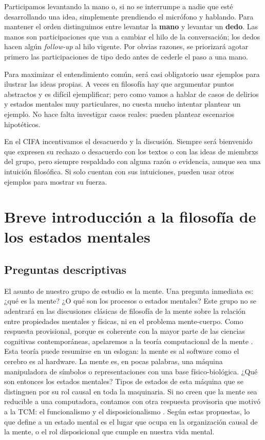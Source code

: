 \documentclass[a4paper,nofonts,justified]{tufte-handout}
\begin{document}
\begin{rules}
  \item[Distinción mano/dedo] Participamos levantando la mano o, si no se interrumpe a nadie que esté desarrollando una idea, simplemente prendiendo el micrófono y hablando. Para mantener el orden distinguimos entre levantar la \textbf{mano} y levantar un \textbf{dedo}. Las manos son participaciones que van a cambiar el hilo de la conversación; los dedos hacen algún \emph{follow-up} al hilo vigente. Por obvias razones, se priorizará agotar primero las participaciones de tipo dedo antes de cederle el paso a una mano.
  \item[Ejemplificación] Para maximizar el entendimiento común, será casi obligatorio usar ejemplos para ilustrar las ideas propias. A veces en filosofía hay que argumentar puntos abstractos y es difícil ejemplificar; pero como vamos a hablar de casos de delirios y estados mentales muy particulares, no cuesta mucho intentar plantear un ejemplo. No hace falta investigar casos reales: pueden plantear escenarios hipotéticos.
  \item[Respaldo] En el CIFA incentivamos el desacuerdo y la discusión. Siempre será bienvenido que expresen su rechazo o desacuerdo con los textos o con las ideas de miembrxs del grupo, pero siempre respaldado con alguna razón o evidencia, aunque sea una intuición filosófica. Si solo cuentan con sus intuiciones, pueden usar otros ejemplos para mostrar su fuerza.
\end{rules}

\section{Breve introducción a la filosofía de los estados mentales}

\subsection{Preguntas descriptivas}
El asunto de nuestro grupo de estudio es la mente. Una pregunta inmediata es: ¿qué es la mente? ¿O qué son los procesos o estados mentales? Este grupo no se adentrará en las discusiones clásicas de filosofía de la mente sobre la relación entre propiedades mentales y físicas, ni en el problema mente-cuerpo. Como respuesta provisional, porque es coherente con la mayor parte de las ciencias cognitivas contemporáneas, apelaremos a la teoría computacional de la mente \citep[TCM;][]{block1995}. Esta teoría puede resumirse en un eslogan: la mente es al software como el cerebro es al hardware. La mente es, en pocas palabras, una máquina manipuladora de símbolos o representaciones con una base físico-biológica. ¿Qué son entonces los estados mentales? Tipos de estados de esta máquina que se distinguen por su rol causal en toda la maquinaria. Si no creen que la mente sea reducible a una computadora, contamos con otra respuesta provisoria que motivó a la TCM: el funcionalismo y el disposicionalismo \citep{lewis1978,stalnaker1984}. Según estas propuestas, lo que define a un estado mental es el lugar que ocupa en la organización causal de la mente, o el rol disposicional que cumple en nuestra vida mental.
\end{document}
